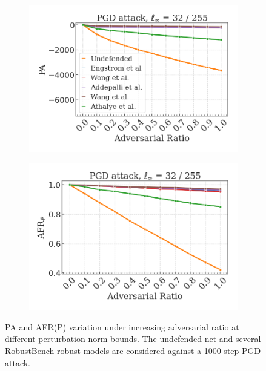 \begin{figure}[H]
    \begin{subfigure}[b]{0.45\textwidth}
        \centering
        \includegraphics[width=\textwidth]{img/results_discussion/adversarial/PGD_0.1255_logPA_linear.png}
    \end{subfigure}
    \begin{subfigure}[b]{0.45\textwidth}
        \centering
        \includegraphics[width=\textwidth]{img/results_discussion/adversarial/PGD_0.1255_AFR_pred.png}
    \end{subfigure}

    \caption{PA and AFR(P) variation under increasing adversarial ratio at different
    perturbation norm bounds. The undefended net and several RobustBench
    robust models are considered against a 1000 step PGD attack.}
    \label{fig:appendix_adversarial_afrpred_pgd}
\end{figure}

